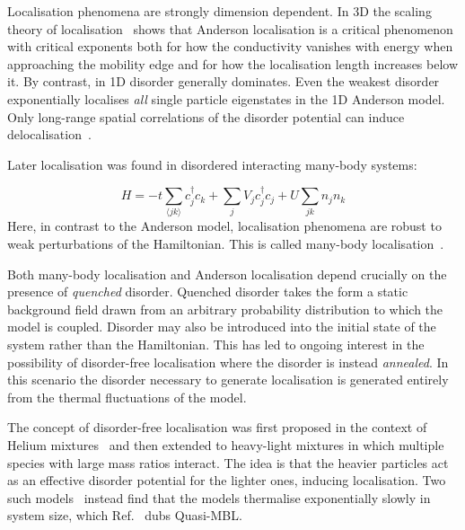 Localisation phenomena are strongly dimension dependent. In 3D the scaling theory of localisation~\autocite{edwardsNumericalStudiesLocalization1972,kramerLocalizationTheoryExperiment1993} shows that Anderson localisation is a critical phenomenon with critical exponents both for how the conductivity vanishes with energy when approaching the mobility edge and for how the localisation length increases below it. By contrast, in 1D disorder generally dominates. Even the weakest disorder exponentially localises \emph{all} single particle eigenstates in the 1D Anderson model. Only long-range spatial correlations of the disorder potential can induce delocalisation~\autocite{aubryAnalyticityBreakingAnderson1980,dassarmaLocalizationMobilityEdges1990,dunlapAbsenceLocalizationRandomdimer1990,izrailevLocalizationMobilityEdge1999,croyAndersonLocalization1D2011,izrailevAnomalousLocalizationLowDimensional2012}.

Later localisation was found in disordered interacting many-body systems:

\[
H = -t\sum_{\langle jk \rangle} c^\dagger_j c_k + \sum_j V_j c_j^\dagger c_j + U\sum_{jk} n_j n_k
\] Here, in contrast to the Anderson model, localisation phenomena are robust to weak perturbations of the Hamiltonian. This is called many-body localisation~\autocite{imbrieManyBodyLocalizationQuantum2016,gogolinEquilibrationThermalisationEmergence2016}.

Both many-body localisation and Anderson localisation depend crucially on the presence of \emph{quenched} disorder. Quenched disorder takes the form a static background field drawn from an arbitrary probability distribution to which the model is coupled. Disorder may also be introduced into the initial state of the system rather than the Hamiltonian. This has led to ongoing interest in the possibility of disorder-free localisation where the disorder is instead \emph{annealed}. In this scenario the disorder necessary to generate localisation is generated entirely from the thermal fluctuations of the model.

The concept of disorder-free localisation was first proposed in the context of Helium mixtures~\autocite{kagan1984localization} and then extended to heavy-light mixtures in which multiple species with large mass ratios interact. The idea is that the heavier particles act as an effective disorder potential for the lighter ones, inducing localisation. Two such models~\autocite{yaoQuasiManyBodyLocalizationTranslationInvariant2016,schiulazDynamicsManybodyLocalized2015} instead find that the models thermalise exponentially slowly in system size, which Ref.~\autocite{yaoQuasiManyBodyLocalizationTranslationInvariant2016} dubs Quasi-MBL.

